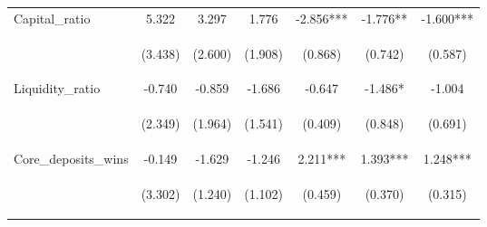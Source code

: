 \documentclass[]{article}
\begin{document}
\begin{center}
\begin{tabular}{lcccccc}
Capital\_ratio & 5.322 & 3.297 & 1.776 & -2.856*** & -1.776** & -1.600*** \\
\vspace{4pt} & \begin{footnotesize}(3.438)\end{footnotesize} & \begin{footnotesize}(2.600)\end{footnotesize} & \begin{footnotesize}(1.908)\end{footnotesize} & \begin{footnotesize}(0.868)\end{footnotesize} & \begin{footnotesize}(0.742)\end{footnotesize} & \begin{footnotesize}(0.587)\end{footnotesize} \\
Liquidity\_ratio & -0.740 & -0.859 & -1.686 & -0.647 & -1.486* & -1.004 \\
\vspace{4pt} & \begin{footnotesize}(2.349)\end{footnotesize} & \begin{footnotesize}(1.964)\end{footnotesize} & \begin{footnotesize}(1.541)\end{footnotesize} & \begin{footnotesize}(0.409)\end{footnotesize} & \begin{footnotesize}(0.848)\end{footnotesize} & \begin{footnotesize}(0.691)\end{footnotesize} \\
Core\_deposits\_wins & -0.149 & -1.629 & -1.246 & 2.211*** & 1.393*** & 1.248*** \\
\vspace{4pt} & \begin{footnotesize}(3.302)\end{footnotesize} & \begin{footnotesize}(1.240)\end{footnotesize} & \begin{footnotesize}(1.102)\end{footnotesize} & \begin{footnotesize}(0.459)\end{footnotesize} & \begin{footnotesize}(0.370)\end{footnotesize} & \begin{footnotesize}(0.315)\end{footnotesize} \\

\end{tabular}
\end{center}
\end{document}
